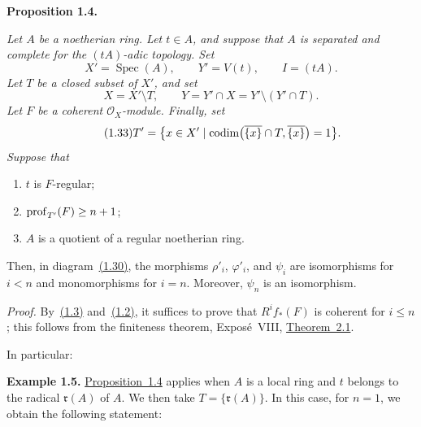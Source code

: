 \noindent\textbf{Proposition 1.4.}\quad
{\itshape Let $A$ be a noetherian ring. Let $t\in A$, and suppose that $A$ is
separated and complete for the $(tA)$-adic topology. Set
\begin{equation}
\tag{1.31}\label{eq:IX.1.31}
X'=\operatorname{Spec}(A),\qquad Y'=V(t),\qquad I=(tA).
\end{equation}
Let $T$ be a closed subset of $X'$, and set
\begin{equation}
\tag{1.32}\label{eq:IX.1.32}
X=X'\setminus T,\qquad
Y=Y'\cap X=Y'\setminus(Y'\cap T).
\end{equation}
Let $F$ be a coherent $\mathcal O_X$-module. Finally, set
\begin{equation}
\tag{1.33}\label{eq:IX.1.33}
T'=\bigl\{x\in X'\mid
\operatorname{codim}\bigl(\overline{\{x\}}\cap T,\overline{\{x\}}\bigr)=1\bigr\}.
\end{equation}
Suppose that
\begin{enumerate}
\renewcommand{\labelenumi}{\alph{enumi})}
\item $t$ is $F$-regular;
\item $\operatorname{prof}_{T'}(F)\ge n+1$;
\item $A$ is a quotient of a regular noetherian ring.
\end{enumerate}
Then, in diagram~\hyperref[eq:IX.1.30]{(1.30)}, the morphisms $\rho'_i$, $\varphi'_i$, and $\psi_i$
are isomorphisms for $i<n$ and monomorphisms for $i=n$. Moreover, $\psi_n$
is an isomorphism.}

\medskip
{}

\noindent\emph{Proof.}\quad
By~\hyperref[eq:IX.1.3]{(1.3)} and~\hyperref[eq:IX.1.2]{(1.2)}, it suffices to prove that $R^i f_*(F)$ is coherent for
$i\le n$; this follows from the finiteness theorem, Expos\'e~VIII,
\hyperref[IX.2.1]{Theorem~2.1}.

\medskip
\noindent In particular:

\noindent\textbf{Example 1.5.}\quad
\hyperref[IX.1.4]{Proposition~1.4} applies when $A$ is a local ring and $t$ belongs to the
radical $\mathfrak r(A)$ of $A$. We then take
$T=\{\mathfrak r(A)\}$. In this case, for $n=1$, we obtain the following
statement:

